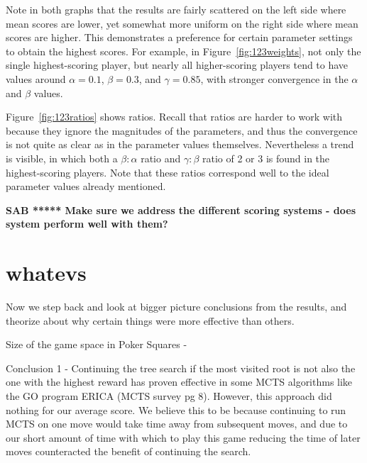 \documentclass[letterpaper]{article}
\begin{document}
Note in both graphs that the results are fairly scattered on the left side where mean scores are lower, yet somewhat more uniform on the right side where mean scores are higher. This demonstrates a preference for certain parameter settings to obtain the highest scores. For example, in Figure~\ref{fig:123weights}, not only the single highest-scoring player, but nearly all higher-scoring players tend to have values around $\alpha = 0.1$, $\beta = 0.3$, and $\gamma = 0.85$, with stronger convergence in the $\alpha$ and $\beta$ values.

Figure~\ref{fig:123ratios} shows ratios. Recall that ratios are harder to work with because they ignore the magnitudes of the parameters, and thus the convergence is not quite as clear as in the parameter values themselves. Nevertheless a trend is visible, in which both a $\beta : \alpha$ ratio and $\gamma : \beta$ ratio of 2 or 3 is found in the highest-scoring players. Note that these ratios correspond well to the ideal parameter values already mentioned.

{\bf SAB ***** Make sure we address the different scoring systems - does system perform well with them?}

\section{whatevs}

Now we step back and look at bigger picture conclusions from the results, and theorize about why certain things were more effective than others.

Size of the game space in Poker Squares - 

Conclusion 1 - Continuing the tree search if the most visited root is not also the one with the highest reward has proven effective in some MCTS algorithms like the GO program ERICA (MCTS survey pg 8). However, this approach did nothing for our average score. We believe this to be because continuing to run MCTS on one move would take time away from subsequent moves, and due to our short amount of time with which to play this game reducing the time of later moves counteracted the benefit of continuing the search.
\end{document}
